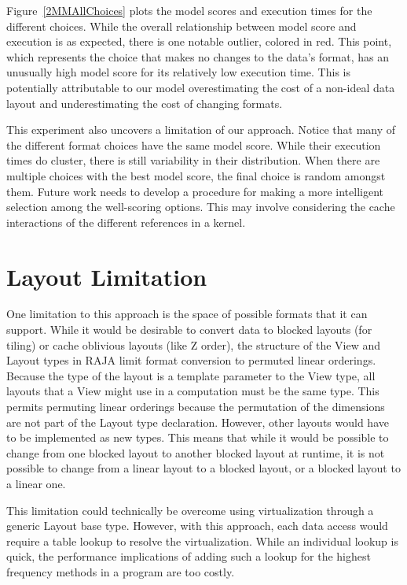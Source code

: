 \documentclass[sigconf,review=true]{acmart}
\begin{document}
Figure~\ref{2MMAllChoices} plots the model scores and execution times for the different choices. 
While the overall relationship between model score and execution is as expected, there is one notable outlier, colored in red.
This point, which represents the choice that makes no changes to the data's format, has an unusually high model score for its relatively low execution time. 
This is potentially attributable to our model overestimating the cost of a non-ideal data layout and underestimating the cost of changing formats. 

This experiment also uncovers a limitation of our approach.
Notice that many of the different format choices have the same model score.
While their execution times do cluster, there is still variability in their distribution.
When there are multiple choices with   the best model score, the final choice is random amongst them.
Future work needs to develop a procedure for making a more intelligent selection among the well-scoring options. 
This may involve considering the cache interactions of the different references in a kernel. 


\section{Layout Limitation}

One limitation to this approach is the space of possible formats that it can support. While it would be desirable to convert data to blocked layouts (for tiling) or cache oblivious layouts (like Z order), the structure of the View and Layout types in RAJA limit format conversion to permuted linear orderings. Because the type of the layout is a template parameter to the View type, all layouts that a View might use in a computation must be the same type. This permits permuting linear orderings because the permutation of the dimensions are not part of the Layout type declaration. However, other layouts would have to be implemented as new types. This means that while it would be possible to change from one blocked layout to another blocked layout at runtime, it is not possible to change from a linear layout to a blocked layout, or a blocked layout to a linear one.

This limitation could technically be overcome using virtualization through a generic Layout base type. However, with this approach, each data access would require a table lookup to resolve the virtualization. While an  individual lookup is quick, the performance implications of adding such a lookup for the highest frequency methods in a program are too costly.
\end{document}
